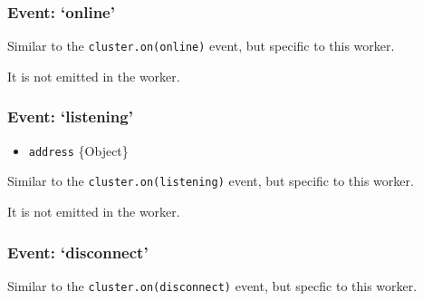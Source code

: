 \subsubsection{\texorpdfstring{Event:
`online'}{Event: online}}\label{event-online-1}

Similar to the
\texttt{cluster.on(\textquotesingle{}online\textquotesingle{})} event,
but specific to this worker.

\begin{Shaded}
\begin{Highlighting}[]
\NormalTok{(}\NormalTok{, }\NormalTok{() \{}
\NormalTok{\});}
\end{Highlighting}
\end{Shaded}

It is not emitted in the worker.

\subsubsection{\texorpdfstring{Event:
`listening'}{Event: listening}}\label{event-listening-1}

\begin{itemize}
\itemsep1pt\parskip0pt
\item
  \texttt{address} \{Object\}
\end{itemize}

Similar to the
\texttt{cluster.on(\textquotesingle{}listening\textquotesingle{})}
event, but specific to this worker.

\begin{Shaded}
\begin{Highlighting}[]
\NormalTok{(}\NormalTok{, }
\NormalTok{\});}
\end{Highlighting}
\end{Shaded}

It is not emitted in the worker.

\subsubsection{\texorpdfstring{Event:
`disconnect'}{Event: disconnect}}\label{event-disconnect-1}

Similar to the
\texttt{cluster.on(\textquotesingle{}disconnect\textquotesingle{})}
event, but specfic to this worker.


